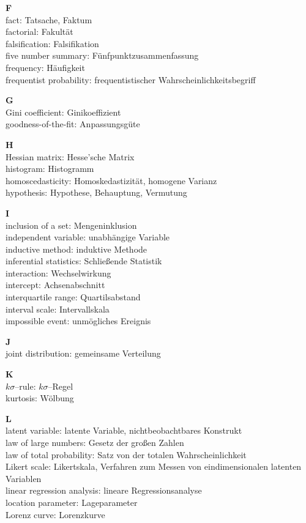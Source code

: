 \medskip
\noindent
{\bf F}\\
fact: Tatsache, Faktum\\
factorial: Fakult\"{a}t\\
falsification: Falsifikation\\
five number summary: F\"{u}nfpunktzusammenfassung\\
frequency: H\"{a}ufigkeit\\
frequentist probability: frequentistischer 
Wahrscheinlichkeitsbegriff

\medskip
\noindent
{\bf G}\\
Gini coefficient: Ginikoeffizient\\
goodness-of-the-fit: Anpassungsg\"{u}te

\medskip
\noindent
{\bf H}\\
Hessian matrix: Hesse'sche Matrix\\
histogram: Histogramm\\
homoscedasticity: Homoskedastizit\"{a}t, homogene Varianz\\
hypothesis: Hypothese, Behauptung, Vermutung

\medskip
\noindent
{\bf I}\\
inclusion of a set: Mengeninklusion\\
independent variable: unabh\"{a}ngige Variable\\
inductive method: induktive Methode\\
inferential statistics: Schlie\ss ende Statistik\\
interaction: Wechselwirkung\\
intercept: Achsenabschnitt\\
interquartile range: Quartilsabstand\\
interval scale: Intervallskala\\
impossible event: unm\"{o}gliches Ereignis

\medskip
\noindent
{\bf J}\\
joint distribution: gemeinsame Verteilung

\medskip
\noindent
{\bf K}\\
$k\sigma$--rule: $k\sigma$--Regel\\
kurtosis: W\"{o}lbung

\medskip
\noindent
{\bf L}\\
latent variable: latente Variable, nichtbeobachtbares Konstrukt\\
law of large numbers: Gesetz der gro\ss en Zahlen\\
law of total probability: Satz von der totalen Wahrscheinlichkeit\\
Likert scale: Likertskala, Verfahren zum Messen von 
eindimensionalen latenten Variablen\\
linear regression analysis: lineare Regressionsanalyse\\
location parameter: Lageparameter\\
Lorenz curve: Lorenzkurve

